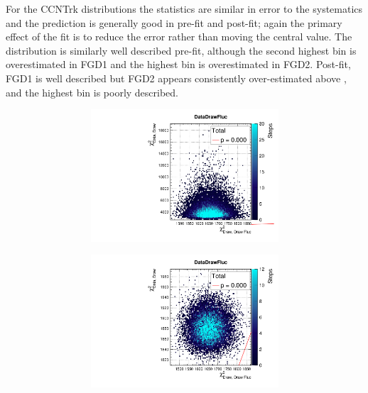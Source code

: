 For the CCNTrk distributions the statistics are similar in error to the systematics and the prediction is generally good in \pmu pre-fit and post-fit; again the primary effect of the fit is to reduce the error rather than moving the central value. The \cosmu distribution is similarly well described pre-fit, although the second highest \cosmu bin is overestimated in FGD1 and the highest \cosmu bin is overestimated in FGD2. Post-fit, FGD1 is well described but FGD2 appears consistently over-estimated above , and the highest \cosmu bin is poorly described.
\begin{figure}[h]
	\begin{subfigure}[t]{\textwidth}
	\begin{subfigure}[t]{0.24\textwidth}
		\includegraphics[width=\textwidth, trim={0mm 0mm 0mm 8mm}, clip,page=64]{figures/mach3/data/priorpred/2017b_NewDet_3Xsec_4Det_5Flux_NewXSecTune_Data_merge_PriorPred_procs}
	\end{subfigure}
	\begin{subfigure}[t]{0.24\textwidth}
		\includegraphics[width=\textwidth, trim={0mm 0mm 0mm 8mm}, clip,page=64]{figures/mach3/data/postpred/2017b_NewData_NewDet_UpdXsecStep_2Xsec_4Det_5Flux_0_PostPred_procs}

\end{subfigure}
\end{subfigure}
\end{figure}
